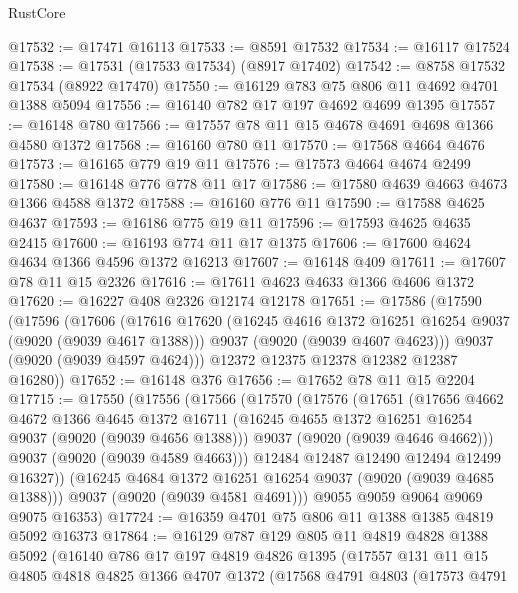 \begin{lexlean}{RustCore}
\begin{coremodule}
@17532 := @17471 @16113
@17533 := @8591 @17532
@17534 := @16117 @17524
@17538 := @17531 (@17533 @17534) (@8917 @17402)
@17542 := @8758 @17532 @17534 (@8922 @17470)
@17550 := @16129 @783 @75 @806 @11 @4692 @4701 @1388 @5094
@17556 := @16140 @782 @17 @197 @4692 @4699 @1395
@17557 := @16148 @780
@17566 := @17557 @78 @11 @15 @4678 @4691 @4698 @1366 @4580 @1372
@17568 := @16160 @780 @11
@17570 := @17568 @4664 @4676
@17573 := @16165 @779 @19 @11
@17576 := @17573 @4664 @4674 @2499
@17580 := @16148 @776 @778 @11 @17
@17586 := @17580 @4639 @4663 @4673 @1366 @4588 @1372
@17588 := @16160 @776 @11
@17590 := @17588 @4625 @4637
@17593 := @16186 @775 @19 @11
@17596 := @17593 @4625 @4635 @2415
@17600 := @16193 @774 @11 @17 @1375
@17606 := @17600 @4624 @4634 @1366 @4596 @1372 @16213
@17607 := @16148 @409
@17611 := @17607 @78 @11 @15 @2326
@17616 := @17611 @4623 @4633 @1366 @4606 @1372
@17620 := @16227 @408 @2326 @12174 @12178
@17651 := @17586
    (@17590
      (@17596
        (@17606
          (@17616
            @17620
            (@16245 @4616 @1372 @16251 @16254 @9037 (@9020 (@9039 @4617 @1388)))
            @9037
            (@9020 (@9039 @4607 @4623)))
          @9037
          (@9020 (@9039 @4597 @4624)))
        @12372
        @12375
        @12378
        @12382
        @12387
        @16280))
@17652 := @16148 @376
@17656 := @17652 @78 @11 @15 @2204
@17715 := @17550
    (@17556
      (@17566
        (@17570
          (@17576
            (@17651
              (@17656
                @4662
                @4672
                @1366
                @4645
                @1372
                @16711
                (@16245 @4655 @1372 @16251 @16254 @9037 (@9020 (@9039 @4656 @1388)))
                @9037
                (@9020 (@9039 @4646 @4662)))
              @9037
              (@9020 (@9039 @4589 @4663)))
            @12484
            @12487
            @12490
            @12494
            @12499
            @16327))
        (@16245 @4684 @1372 @16251 @16254 @9037 (@9020 (@9039 @4685 @1388)))
        @9037
        (@9020 (@9039 @4581 @4691)))
      @9055
      @9059
      @9064
      @9069
      @9075
      @16353)
@17724 := @16359 @4701 @75 @806 @11 @1388 @1385 @4819 @5092 @16373
@17864 := @16129
    @787
    @129
    @805
    @11
    @4819
    @4828
    @1388
    @5092
    (@16140
      @786
      @17
      @197
      @4819
      @4826
      @1395
      (@17557
        @131
        @11
        @15
        @4805
        @4818
        @4825
        @1366
        @4707
        @1372
        (@17568
          @4791
          @4803
          (@17573
            @4791

\end{coremodule}
\end{lexlean}
